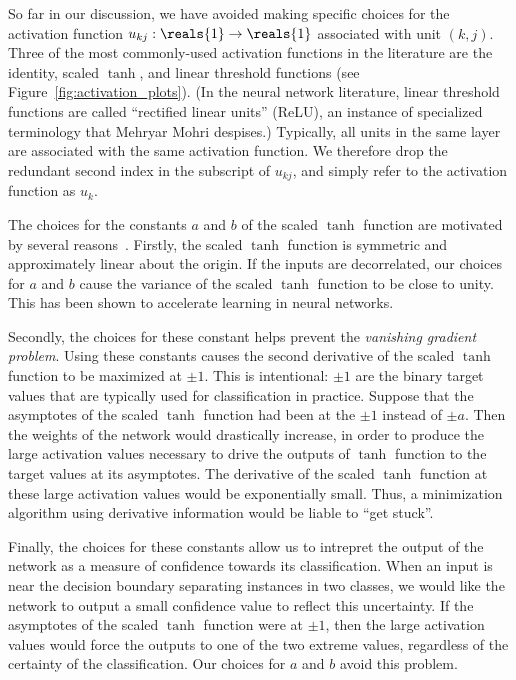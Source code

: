 \documentclass[11pt,a4paper]{article}
\numberwithin{equation}{section}
\begin{document}
So far in our discussion, we have avoided making specific choices for the
activation function $u_{kj} : \reals{1} \to \reals{1}$ associated with unit $(k,
j)$. Three of the most commonly-used activation functions in the literature are
the identity, scaled $\tanh$, and linear threshold functions (see
Figure~\ref{fig:activation_plots}). (In the neural network literature, linear
threshold functions are called ``rectified linear units'' (ReLU), an instance of
specialized terminology that Mehryar Mohri despises.) Typically, all units in
the same layer are associated with the same activation function. We therefore
drop the redundant second index in the subscript of $u_{kj}$, and simply refer
to the activation function as $u_k$.

The choices for the constants $a$ and $b$ of the scaled $\tanh$ function are
motivated by several reasons~\citep{lecun-98b}. Firstly, the scaled $\tanh$
function is symmetric and approximately linear about the origin. If the inputs
are decorrelated, our choices for $a$ and $b$ cause the variance of the scaled
$\tanh$ function to be close to unity. This has been shown to accelerate
learning in neural networks.

Secondly, the choices for these constant helps prevent the \emph{vanishing
gradient problem}. Using these constants causes the second derivative of the
scaled $\tanh$ function to be maximized at $\pm 1$. This is intentional: $\pm 1$
are the binary target values that are typically used for classification in
practice. Suppose that the asymptotes of the scaled $\tanh$ function had been at
the $\pm 1$ instead of $\pm a$. Then the weights of the network would
drastically increase, in order to produce the large activation values necessary
to drive the outputs of $\tanh$ function to the target values at its asymptotes.
The derivative of the scaled $\tanh$ function at these large activation values
would be exponentially small.  Thus, a minimization algorithm using derivative
information would be liable to ``get stuck''.

Finally, the choices for these constants allow us to intrepret the output of the
network as a measure of confidence towards its classification. When an input is
near the decision boundary separating instances in two classes, we would like
the network to output a small confidence value to reflect this uncertainty. If
the asymptotes of the scaled $\tanh$ function were at $\pm 1$, then the large
activation values would force the outputs to one of the two extreme values,
regardless of the certainty of the classification. Our choices for $a$ and $b$
avoid this problem.
\end{document}
